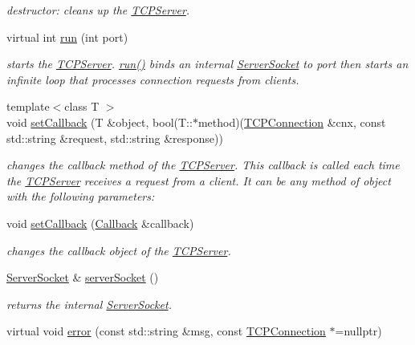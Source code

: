 \begin{DoxyCompactItemize}
\begin{DoxyCompactList}\small\item\em destructor\+: cleans up the \hyperlink{classcppu_1_1TCPServer}{T\+C\+P\+Server}. \end{DoxyCompactList}\item 
virtual int \hyperlink{classcppu_1_1TCPServer_a98e00d62745812b17bdee9f07f2070c4}{run} (int port)
\begin{DoxyCompactList}\small\item\em starts the \hyperlink{classcppu_1_1TCPServer}{T\+C\+P\+Server}. \hyperlink{classcppu_1_1TCPServer_a98e00d62745812b17bdee9f07f2070c4}{run()} binds an internal \hyperlink{classcppu_1_1ServerSocket}{Server\+Socket} to {\itshape port} then starts an infinite loop that processes connection requests from clients. \end{DoxyCompactList}\item 
{\footnotesize template$<$class T $>$ }\\void \hyperlink{classcppu_1_1TCPServer_a7d4fdb93439015934004755fde72945b}{set\+Callback} (T \&object, bool(T\+::$\ast$method)(\hyperlink{classcppu_1_1TCPConnection}{T\+C\+P\+Connection} \&cnx, const std\+::string \&request, std\+::string \&response))
\begin{DoxyCompactList}\small\item\em changes the callback method of the \hyperlink{classcppu_1_1TCPServer}{T\+C\+P\+Server}. This callback is called each time the \hyperlink{classcppu_1_1TCPServer}{T\+C\+P\+Server} receives a request from a client. It can be any method of {\itshape object} with the following parameters\+: \end{DoxyCompactList}\item 
void \hyperlink{classcppu_1_1TCPServer_a94d3d97b03d5e3e48609e405d8dd7897}{set\+Callback} (\hyperlink{structcppu_1_1TCPServer_1_1Callback}{Callback} \&callback)
\begin{DoxyCompactList}\small\item\em changes the callback object of the \hyperlink{classcppu_1_1TCPServer}{T\+C\+P\+Server}. \end{DoxyCompactList}\item 
\hyperlink{classcppu_1_1ServerSocket}{Server\+Socket} \& \hyperlink{classcppu_1_1TCPServer_a6428b63a4440045050dba4f33bb454bf}{server\+Socket} ()\hypertarget{classcppu_1_1TCPServer_a6428b63a4440045050dba4f33bb454bf}{}\label{classcppu_1_1TCPServer_a6428b63a4440045050dba4f33bb454bf}

\begin{DoxyCompactList}\small\item\em returns the internal \hyperlink{classcppu_1_1ServerSocket}{Server\+Socket}. \end{DoxyCompactList}\item 
virtual void \hyperlink{classcppu_1_1TCPServer_afc47ca4476d9c75d5ea88f73e2acd6d5}{error} (const std\+::string \&msg, const \hyperlink{classcppu_1_1TCPConnection}{T\+C\+P\+Connection} $\ast$=nullptr)\hypertarget{classcppu_1_1TCPServer_afc47ca4476d9c75d5ea88f73e2acd6d5}{}\label{classcppu_1_1TCPServer_afc47ca4476d9c75d5ea88f73e2acd6d5}


\end{DoxyCompactItemize}
